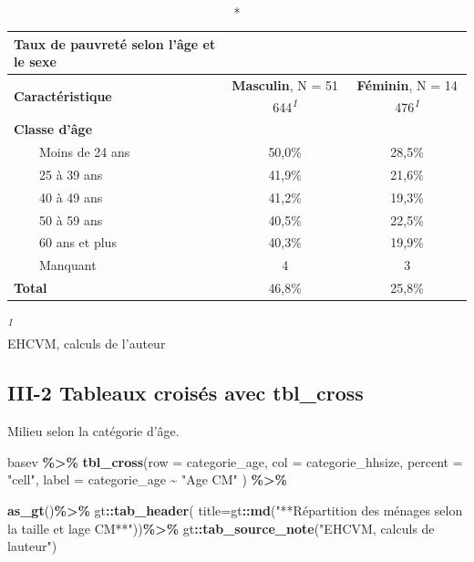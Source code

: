 \documentclass[
]{article}
\newenvironment{Shaded}{\begin{snugshade}}{\end{snugshade}}
\newcommand{\AttributeTok}[1]{\textcolor[rgb]{0.13,0.29,0.53}{#1}}
\newcommand{\FunctionTok}[1]{\textcolor[rgb]{0.13,0.29,0.53}{\textbf{#1}}}
\newcommand{\NormalTok}[1]{#1}
\newcommand{\SpecialCharTok}[1]{\textcolor[rgb]{0.81,0.36,0.00}{\textbf{#1}}}
\newcommand{\StringTok}[1]{\textcolor[rgb]{0.31,0.60,0.02}{#1}}
\begin{document}
\setlength{\LTpost}{0mm}
\begin{longtable}{lcc}
\caption*{
{\large \textbf{Taux de pauvreté selon l'âge et le sexe}}
} \\ 
\toprule
\textbf{Caractéristique} & \textbf{Masculin}, N = 51 644\textsuperscript{\textit{1}} & \textbf{Féminin}, N = 14 476\textsuperscript{\textit{1}} \\ 
\midrule\addlinespace[2.5pt]
\textbf{Classe d'âge} &  &  \\ 
    Moins de 24 ans & 50,0\%  & 28,5\%  \\ 
    25 à 39 ans & 41,9\%  & 21,6\%  \\ 
    40 à 49 ans & 41,2\%  & 19,3\%  \\ 
    50 à 59 ans & 40,5\%  & 22,5\%  \\ 
    60 ans et plus & 40,3\%  & 19,9\%  \\ 
    Manquant & 4 & 3 \\ 
\textbf{Total} & 46,8\%  & 25,8\%  \\ 
\bottomrule
\end{longtable}
\begin{minipage}{\linewidth}
\textsuperscript{\textit{1}}\\
EHCVM, calculs de l'auteur\\
\end{minipage}

\hypertarget{iii-2-tableaux-croisuxe9s-avec-tbl_cross}{%
\subsection{III-2 Tableaux croisés avec
tbl\_cross}\label{iii-2-tableaux-croisuxe9s-avec-tbl_cross}}

Milieu selon la catégorie d'âge.

\begin{Shaded}
\begin{Highlighting}[]
\NormalTok{basev }\SpecialCharTok{\%\textgreater{}\%} \FunctionTok{tbl\_cross}\NormalTok{(}\AttributeTok{row =}\NormalTok{ categorie\_age,}
                    \AttributeTok{col =}\NormalTok{ categorie\_hhsize,}
                    \AttributeTok{percent =} \StringTok{"cell"}\NormalTok{,}
                    \AttributeTok{label =}\NormalTok{ categorie\_age }\SpecialCharTok{\textasciitilde{}} \StringTok{"Age CM"}\NormalTok{ ) }\SpecialCharTok{\%\textgreater{}\%}

  \FunctionTok{as\_gt}\NormalTok{()}\SpecialCharTok{\%\textgreater{}\%}
\NormalTok{  gt}\SpecialCharTok{::}\FunctionTok{tab\_header}\NormalTok{(}
    \AttributeTok{title=}\NormalTok{gt}\SpecialCharTok{::}\FunctionTok{md}\NormalTok{(}\StringTok{"**Répartition des ménages}
\StringTok{                 selon la taille et l\textquotesingle{}age CM**"}\NormalTok{))}\SpecialCharTok{\%\textgreater{}\%}
\NormalTok{  gt}\SpecialCharTok{::}\FunctionTok{tab\_source\_note}\NormalTok{(}\StringTok{"EHCVM, calculs de l\textquotesingle{}auteur"}\NormalTok{)}
\end{Highlighting}
\end{Shaded}
\end{document}
